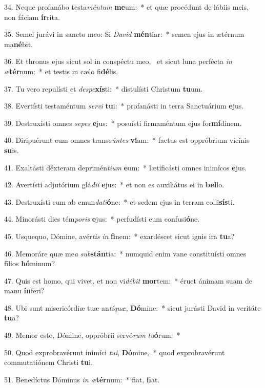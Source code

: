 34. Neque profanábo testa\textit{mén}\textit{tum} \textbf{me}um:~*  et quæ procédunt de lábiis meis, non fáciam \textbf{ír}rita.\

35. Semel jurávi in sancto meo: Si \textit{Da}\textit{vid} \textbf{mén}tiar:~*  semen ejus in ætérnum ma\textbf{né}bit.\

36. Et thronus ejus sicut sol in conspéctu meo, \dag\  et sicut luna perfécta \textit{in} \textit{æ}\textbf{tér}num:~*  et testis in cælo fi\textbf{dé}lis.\

37. Tu vero repulísti et \textit{de}\textit{spe}\textbf{xís}ti:~*  distulísti Christum \textbf{tu}um.\

38. Evertísti testaméntum \textit{ser}\textit{vi} \textbf{tu}i:~*  profanásti in terra Sanctuárium \textbf{e}jus.\

39. Destruxísti omnes \textit{se}\textit{pes} \textbf{e}jus:~*  posuísti firmaméntum ejus for\textbf{mí}dinem.\

40. Diripuérunt eum omnes transe\textit{ún}\textit{tes} \textbf{vi}am:~*  factus est oppróbrium vicínis \textbf{su}is.\

41. Exaltásti déxteram deprimén\textit{ti}\textit{um} \textbf{e}um:~*  lætificásti omnes inimícos \textbf{e}jus.\

42. Avertísti adjutórium glá\textit{di}\textit{i} \textbf{e}jus:~*  et non es auxiliátus ei in \textbf{bel}lo.\

43. Destruxísti eum ab emun\textit{da}\textit{ti}\textbf{ó}ne:~*  et sedem ejus in terram colli\textbf{sís}ti.\

44. Minorásti dies tém\textit{po}\textit{ris} \textbf{e}jus:~*  perfudísti eum confusi\textbf{ó}ne.\

45. Usquequo, Dómine, avér\textit{tis} \textit{in} \textbf{fi}nem:~*  exardéscet sicut ignis ira \textbf{tu}a?\

46. Memoráre quæ me\textit{a} \textit{sub}\textbf{stán}tia:~*  numquid enim vane constituísti omnes fílios \textbf{hó}minum?\

47. Quis est homo, qui vivet, et non vi\textit{dé}\textit{bit} \textbf{mor}tem:~*  éruet ánimam suam de manu \textbf{ín}feri?\

48. Ubi sunt misericórdiæ tuæ an\textit{tí}\textit{quæ}, \textbf{Dó}mine:~*  sicut jurásti David in veritáte \textbf{tu}a?\

49. Memor esto, Dómine, oppróbrii servó\textit{rum} \textit{tu}\textbf{ó}rum:~*  \

50. Quod exprobravérunt inimíci \textit{tu}\textit{i}, \textbf{Dó}mine,~*  quod exprobravérunt commutatiónem Christi \textbf{tu}i.\

51. Benedíctus Dóminus \textit{in} \textit{æ}\textbf{tér}num:~*  fiat, \textbf{fi}at.\

